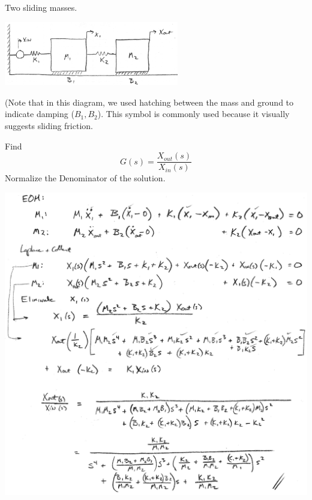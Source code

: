 \begin{Example}
Two sliding masses.


\includegraphics[width=3.0in]{figs02/00727a.png}

(Note that in this diagram, we used hatching between the mass and ground to indicate damping ($B_1, B_2$).  This symbol is commonly used because it visually suggests sliding friction.

Find
\[
G(s) = \frac{X_{out}(s)}{X_{in}(s)}
\]
Normalize the Denominator of the solution.

\includegraphics[width=6.25in]{figs02/00729a.png}

\end{Example}





